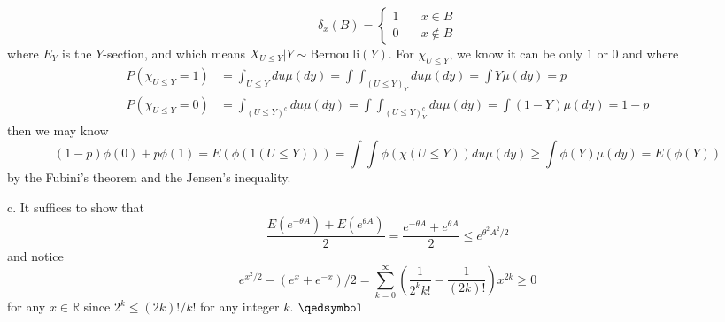 \documentclass[lang=en,11pt,a4paper,citestyle =authoryear]{elegantpaper}
\newcommand{\prvd}{$\hfill \qedsymbol$}
\newcommand{\R}{\mathbb{R}}
\begin{document}
\[
\delta_x(B) = \begin{cases}
    1\quad & x\in B \\
    0&x\notin B
\end{cases}
\]
where $E_Y$ is the $Y$-section, and which means $X_{U\leq Y}|Y \sim \text{Bernoulli}(Y )$. For $\chi_{U\leq Y}$, we know it can be only $1$ or $0$ and where
\[
\begin{aligned}
    P(\chi_{U\leq Y} = 1) &= \int_{U\leq Y} du \mu(dy) = \int \int_{(U\leq Y)_Y} du \mu(dy) = \int Y\mu(dy) = p \\
    P(\chi_{U\leq Y} = 0) &= \int_{(U\leq Y)^c} du \mu(dy) = \int \int_{(U\leq Y)^c_Y} du \mu(dy) = \int (1-Y)\mu(dy) = 1-p
\end{aligned}
\]
then we may know
\[
(1-p)\phi(0)+p\phi(1) = E(\phi(1(U\leq Y)))  = \int \int \phi(\chi(U\leq Y)) du \mu(dy) \geq \int \phi(Y) \mu(dy) = E(\phi(Y))
\]
by the Fubini's theorem and the Jensen's inequality.\par
c. It suffices to show that
\[
\dfrac{E(e^{-\theta A})+E(e^{\theta A})}{2} = \dfrac{e^{-\theta A}+e^{\theta A}}{2} \leq e^{\theta^2A^2/2}
\]
and notice
\[
e^{x^2/2} - (e^x+e^{-x})/2 = \sum\limits_{k=0}^{\infty} (\dfrac{1}{2^kk!}-\dfrac{1}{(2k)!})x^{2k} \geq 0
\]
for any $x\in\R$ since $2^k \leq (2k)!/k!$ for any integer $k$.
\prvd
\vspace{0.5em}
\end{document}
